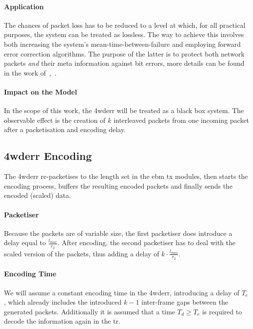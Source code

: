 \paragraph{Application}
The chances of packet loss has to be reduced to a level at which, for all practical purposes, the system can be treated as lossless.
The way to achieve this involves both increasing the system's mean-time-between-failure and employing forward error correction algorithms.
The purpose of the latter is to protect both network packets \emph{and} their meta information against bit errors, more details can be found in the work of~\citeauthor{prados_boda_fec_2010},~\cite{prados_boda_fec_2010}.
\paragraph{Impact on the Model}
In the scope of this work, the \gls{4wderr} will be treated as a black box system. The observable effect is the creation of $k$ interleaved packets from one incoming packet after a packetisation and encoding delay.

\subsection{\gls{4wderr} Encoding}
The \gls{4wderr} re-packetises to the length set in the \gls{ebm} \gls{tx} modules, then starts the encoding process, buffers the resulting encoded packets and finally sends the encoded (scaled) data.

\paragraph{Packetiser} Because the packets are of variable size, the first packetiser does introduce a delay equal to $\frac{l_{max}}{r_2}$. After encoding,
the second packetiser has to deal with the scaled version of the packets, thus adding a delay of $k \cdot \frac{  l_{max}}{r_2}$.

\paragraph{Encoding Time}
We will assume a constant encoding time in the \gls{4wderr}, introducing a delay of $T_e$, which already includes the introduced $k-1$ inter-frame gaps between the generated packets.
Additionally it is assumed that a time $T_d \ge T_e$ is required to decode the information again in the \gls{tr}.

